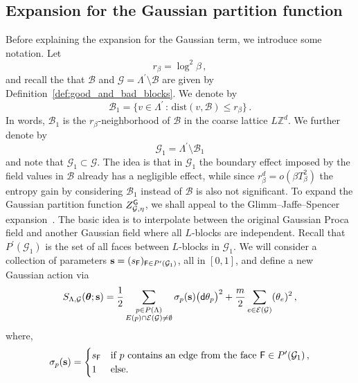 \documentclass[11pt]{article}
\theoremstyle{definition}
\theoremstyle{remark}
\numberwithin{theorem}{section}
\def\La{{\Lambda}}
\newcommand{\cE}{\mathcal{E}}
\newcommand{\cB}{\mathcal B}
\newcommand{\cG}{\mathcal G}
\newcommand{\Z}{\mathbb{Z}}
\begin{document}
    \subsection{Expansion for the Gaussian partition function} \label{subsection:expansion_of_gaussian_partition}
    Before explaining the expansion for the Gaussian term, we introduce some notation. Let 
    \begin{equation*}
    r_\beta = \log^2\beta\, ,    
    \end{equation*}
    and recall the that $\cB$ and $\cG = \La^\prime \setminus \cB $ are given by Definition~\ref{def:good_and_bad_blocks}. We denote by 
    \begin{equation}
        \label{eq:def_of_B_1}
        \mathcal{B}_1 = \big\{ v\in \La^\prime \, : \, \text{dist}(v, \mathcal{B}) \le r_\beta \big\} 
        \, .
    \end{equation}
    In words, $\mathcal{B}_1$ is the $r_{\beta}$-neighborhood of $\mathcal{B}$ in the coarse lattice $L\Z^d$. We further denote by 
    $$\mathcal{G}_1 = \La^\prime \setminus \mathcal{B}_1$$ and note that $\mathcal{G}_1 \subset \mathcal{G}$. The idea is that in $\mathcal{G}_1$ the boundary effect imposed by the field values in $\mathcal{B}$ already has a negligible effect, while since $r_\beta^{d} = o(\beta T_\beta^2)$ the entropy gain by considering $\mathcal{B}_1$ instead of $\mathcal{B}$ is also not significant. 
    To expand the Gaussian partition function $Z_{\mathcal{G},\eta}^{\sf G}$, we shall appeal to the Glimm--Jaffe--Spencer expansion~\cite{Glimm-Jaffe-book,Glimm-Jaffe-Spencer}. The basic idea is to interpolate between the original Gaussian Proca field and another Gaussian field where all $L$-blocks are independent. Recall that $P^\prime(\mathcal{G}_1)$ is the set of all faces between $L$-blocks in $\mathcal{G}_1$. We will consider a collection of parameters $\mathbf{s} = (s_{\sf F})_{{\sf F} \in P^\prime(\mathcal{G}_1)}$, all in $[0,1]$, and define a new Gaussian action via
    \begin{equation}
        \label{eq:def_of_gaussian_action_with_s}
        S_{\Lambda,\mathcal{G}}(\boldsymbol{\theta};\mathbf{s}) = \frac{1}{2} \sum_{\substack{p\in P(\Lambda) \\ E(p)\cap \cE(\mathcal{G}) \not= \emptyset}}  \sigma_p(\mathbf{s}) \big({\sf d}\theta_p\big)^2 + \frac{m}{2}\sum_{e\in \cE(\mathcal{G})} (\theta_e)^2 \, , 
    \end{equation}
    where,
    \begin{equation}
        \label{eq:def_of_sigma_p}
        \sigma_p(\mathbf{s}) = \begin{cases}
            s_{\sf F} & \text{if} \ p \ \text{contains an edge from the face} \  {\sf F} \in P^\prime(\mathcal{G}_1) \, , \\ 1 & \text{else.}
        \end{cases}
    \end{equation}
\end{document}
